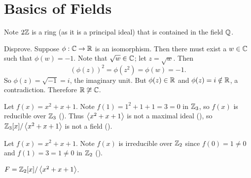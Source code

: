 \section{Basics of Fields}
\begin{questions}
    \item Note $2\mathbb{Z}$ is a ring (as it is a principal ideal) that is contained in the field $\mathbb{Q}$.
    
    \item Disprove. Suppose $\phi: \mathbb{C} \to \mathbb{R}$ is an isomorphism. Then there must exist a $w \in \mathbb{C}$ such that $\phi(w) = -1$. Note that $\sqrt{w} \in \mathbb{C}$; let $z = \sqrt{w}$. Then
    \[
        \left(\phi(z)\right)^2 = \phi\left(z^2\right) = \phi(w) = -1.
    \]
    So $\phi(z) = \sqrt{-1} = i$, the imaginary unit. But $\phi(z) \in \mathbb{R}$ and $\phi(z) = i \notin \mathbb{R}$, a contradiction. Therefore $\mathbb{R} \not\cong \mathbb{C}$.
    
    \item Let $f(x) = x^2 + x + 1$. Note $f(1) = 1^2 + 1 + 1 = 3 = 0$ in $\mathbb{Z}_3$, so $f(x)$ is reducible over $\mathbb{Z}_3$ (). Thus $\left\langle x^2+x+1\right\rangle$ is not a maximal ideal (), so $\mathbb{Z}_3[x]/\left\langle x^2+x+1\right\rangle$ is not a field ().
    
    \item Let $f(x) = x^2 + x + 1$. Note $f(x)$ is irreducible over $\mathbb{Z}_2$ since $f(0) = 1 \neq 0$ and $f(1) = 3 = 1 \neq 0$ in $\mathbb{Z}_2$ ().
    
    $F = \mathbb{Z}_2[x]/\left\langle x^2+x+1\right\rangle$.


\end{questions}
